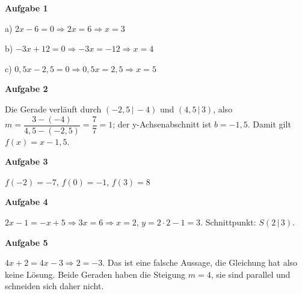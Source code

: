 \documentclass[11pt,a4paper]{article}
\begin{document}
\noindent\textbf{Aufgabe 1}\par
a) $2x - 6 = 0 \Rightarrow 2x = 6 \Rightarrow x = 3$\par
b) $-3x + 12 = 0 \Rightarrow -3x = -12 \Rightarrow x = 4$\par
c) $0{,}5x - 2{,}5 = 0 \Rightarrow 0{,}5x = 2{,}5 \Rightarrow x = 5$\par

\vspace{3mm}
\noindent\textbf{Aufgabe 2}\par
Die Gerade verläuft durch $(-2{,}5\,|\,-4)$ und $(4{,}5\,|\,3)$, also
$m = \dfrac{3 - (-4)}{4{,}5 - (-2{,}5)} = \dfrac{7}{7} = 1$; der y-Achsenabschnitt ist $b = -1{,}5$.
Damit gilt $f(x) = x - 1{,}5$.

\vspace{3mm}
\noindent\textbf{Aufgabe 3}\par
$f(-2) = -7$, \quad $f(0) = -1$, \quad $f(3) = 8$

\vspace{3mm}
\noindent\textbf{Aufgabe 4}\par
$2x - 1 = -x + 5 \Rightarrow 3x = 6 \Rightarrow x = 2$, \quad $y = 2 \cdot 2 - 1 = 3$.
Schnittpunkt: $S(2\,|\,3)$.

\vspace{3mm}
\noindent\textbf{Aufgabe 5}\par
$4x + 2 = 4x - 3 \Rightarrow 2 = -3$. Das ist eine falsche Aussage, die Gleichung hat also keine Lösung.
Beide Geraden haben die Steigung $m = 4$, sie sind parallel und schneiden sich daher nicht.
\end{document}
